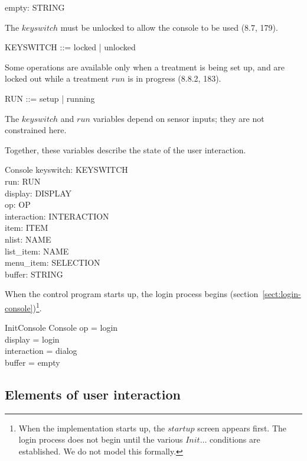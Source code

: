 \begin{zed}
	[STRING]
\end{zed}

\begin{axdef}
	empty: STRING
\end{axdef}
The $keyswitch$ must be unlocked to allow the console to be used (8.7, 179).

\begin{zed}
	KEYSWITCH ::= locked | unlocked
\end{zed}
Some operations are available only when a treatment is being set up,
and are locked out while a treatment $run$ is in progress (8.8.2, 183).

\begin{zed}
	RUN ::= setup | running
\end{zed}
The $keyswitch$ and $run$ variables depend on sensor inputs; they are not
constrained here.

Together, these variables describe the state of the user interaction.

\begin{schema}{Console}
	keyswitch: KEYSWITCH \\
	run: RUN \\
	display: DISPLAY \\
	op: OP \\
	interaction: INTERACTION \\
	item: ITEM \\
	nlist: \power NAME \\
	list\_item: NAME \\
	menu\_item: SELECTION \\
	buffer: STRING
\end{schema}
When the control program starts up, the login process begins
(section~\ref{sect:login-console})\footnote{When the implementation
starts up, the $startup$ screen appears first.  The login process does
not begin until the various $Init\dots$ conditions are established.
We do not model this formally.}.

\begin{schema}{InitConsole}
	Console
\where
	op = login \\
	display = login \\
	interaction = dialog \\
	buffer = empty
\end{schema}

\subsection{Elements of user interaction} \label{sect:gui-elts}

